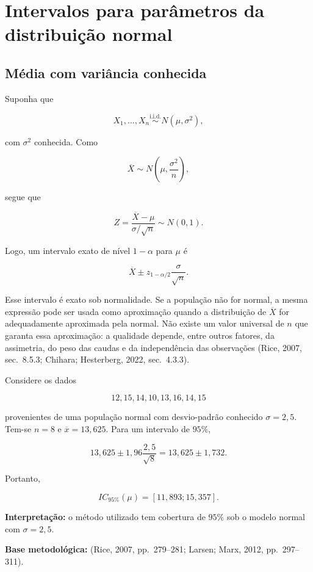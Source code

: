 \documentclass[
  letterpaper,
  DIV=11,
  numbers=noendperiod]{scrreprt}
\begin{document}
\section{Intervalos para parâmetros da distribuição
normal}\label{intervalos-para-paruxe2metros-da-distribuiuxe7uxe3o-normal}

\subsection{Média com variância
conhecida}\label{muxe9dia-com-variuxe2ncia-conhecida}

Suponha que

\[X_1,\ldots,X_n\overset{\mathrm{i.i.d.}}{\sim}N(\mu,\sigma^2),\]

com \(\sigma^2\) conhecida. Como

\[\overline X\sim N\left(\mu,\frac{\sigma^2}{n}\right),\]

segue que

\[Z=\frac{\overline X-\mu}{\sigma/\sqrt n}\sim N(0,1).\]

Logo, um intervalo exato de nível \(1-\alpha\) para \(\mu\) é

\[\boxed{
\overline X\pm z_{1-\alpha/2}\frac{\sigma}{\sqrt n}
}.\]

Esse intervalo é exato sob normalidade. Se a população não for normal, a
mesma expressão pode ser usada como aproximação quando a distribuição de
\(\overline X\) for adequadamente aproximada pela normal. Não existe um
valor universal de \(n\) que garanta essa aproximação: a qualidade
depende, entre outros fatores, da assimetria, do peso das caudas e da
independência das observações (Rice, 2007, sec.~8.5.3; Chihara;
Hesterberg, 2022, sec.~4.3.3).

\begin{tcolorbox}[enhanced jigsaw, colback=white, leftrule=.75mm, colbacktitle=quarto-callout-note-color!10!white, breakable, titlerule=0mm, bottomtitle=1mm, title=\textcolor{quarto-callout-note-color}{\faInfo}\hspace{0.5em}{Exemplo --- média com variância conhecida}, colframe=quarto-callout-note-color-frame, toprule=.15mm, opacityback=0, bottomrule=.15mm, opacitybacktitle=0.6, arc=.35mm, toptitle=1mm, rightrule=.15mm, coltitle=black, left=2mm]

Considere os dados

\[12,15,14,10,13,16,14,15\]

provenientes de uma população normal com desvio-padrão conhecido
\(\sigma=2{,}5\). Tem-se \(n=8\) e \(\overline x=13{,}625\). Para um
intervalo de \(95\%\),

\[13{,}625\pm1{,}96\frac{2{,}5}{\sqrt 8}
=13{,}625\pm1{,}732.\]

Portanto,

\[IC_{95\%}(\mu)=[11{,}893;15{,}357].\]

\textbf{Interpretação:} o método utilizado tem cobertura de \(95\%\) sob
o modelo normal com \(\sigma=2{,}5\).

\textbf{Base metodológica:} (Rice, 2007, pp.~279--281; Larsen; Marx,
2012, pp.~297--311).

\end{tcolorbox}
\end{document}
